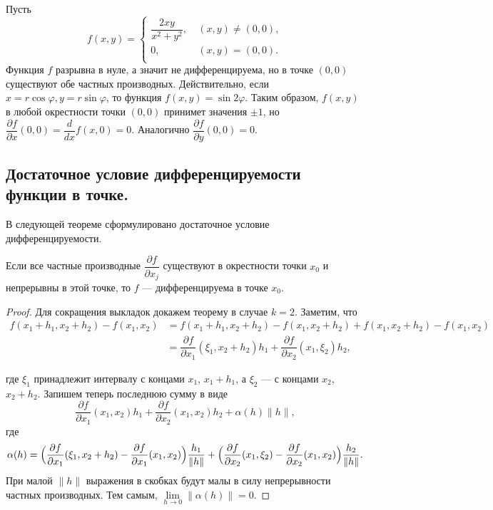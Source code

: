 \documentclass[a4paper]{article}
\theoremstyle{named}
\begin{document}
    \begin{example*}
        Пусть
        $$
            f(x,y)=
            \left\{
            \begin{aligned}
                \dfrac{2xy}{x^2+y^2}, &\ (x,y)\ne(0,0), \\
                0, &\ (x,y)=(0,0).\\
            \end{aligned}
            \right.
        $$
        Функция $f$ разрывна в нуле, а значит не дифференцируема, но в точке $(0,0)$ существуют обе частных производных.
        Действительно, если $x=r\cos\varphi, y=r\sin\varphi$, то функция $f(x,y) = \sin2\varphi$. Таким образом, $f(x,y)$ в любой окрестности точки $(0,0)$ принимет значения $\pm1$, но $\dfrac{\partial f}{\partial x}(0,0) = \dfrac{d}{dx}f(x,0) = 0$.
        Аналогично $\dfrac{\partial f}{\partial y}(0,0)=0$.
    \end{example*}

    \subsection{Достаточное условие дифференцируемости функции в точке.}

    В следующей теореме сформулировано достаточное условие дифференцируемости.

    \begin{theorem*}
        Если все частные производные $\dfrac{\partial f}{\partial x_j}$ существуют в окрестности точки $x_0$ и непрерывны в этой точке, то $f$ --- дифференцируема в точке $x_0$.
    \end{theorem*}

    \begin{proof}
        Для сокращения выкладок докажем теорему в случае $k=2$.
        Заметим, что
        \begin{align*}
            f(x_1+h_1,x_2+h_2) - f(x_1,x_2)
            &=f(x_1+h_1,x_2+h_2) - f(x_1,x_2+h_2) + f(x_1, x_2+h_2) - f(x_1,x_2) \\
            &=\dfrac{\partial f}{\partial x_1}(\xi_1, x_2+h_2)h_1 + \dfrac{\partial f}{\partial x_2}(x_1,\xi_2)h_2,
        \end{align*}

        где $\xi_1$ принадлежит интервалу с концами
        $x_1$, $x_1+h_1$, а $\xi_2$ --- с концами $x_2$, $x_2+h_2$.
        Запишем теперь последнюю сумму в виде
        $$
            \dfrac{\partial f}{\partial x_1}(x_1, x_2)h_1 + \dfrac{\partial f}{\partial x_2}(x_1,x_2)h_2 + \alpha(h)\|h\|,
        $$
        где
        $$
            \alpha(h) =
            \Bigl(\dfrac{\partial f}{\partial x_1}(\xi_1, x_2+h_2) - \dfrac{\partial f}{\partial x_1}(x_1, x_2)\Bigr)\dfrac{h_1}{\|h\|}
            +
            \Bigl(\dfrac{\partial f}{\partial x_2}(x_1,\xi_2) - \dfrac{\partial f}{\partial x_2}(x_1, x_2)\Bigr)\dfrac{h_2}{\|h\|}.
        $$
        При малой $\|h\|$ выражения в скобках будут малы в силу непрерывности частных производных.
        Тем самым, $\lim\limits_{h\to 0}\|\alpha(h)\| = 0$.
    \end{proof}
\end{document}
